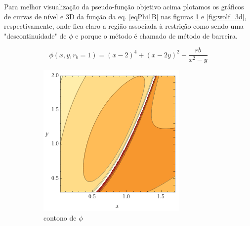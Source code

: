 \documentclass[10pt, a4paper]{article}
\begin{document}
\newpage
Para melhor visualiza\c c\~ao da pseudo-fun\c c\~ao objetivo acima plotamos os gr\'aficos de curvas de n\'ivel e 3D da fun\c c\~ao da eq. \ref{eqPhi1B} nas figuras \ref{fig:wolf_contour} e \ref{fig:wolf_3d}, respectivamente, onde fica claro a regi\~ao associada \`a restri\c c\~ao como sendo uma "descontinuidade" de $\phi$ e porque o m\'etodo \'e chamado de m\'etodo de barreira.

\begin{equation} \label{eqPhi1B}
      \phi (x,y, r_b=1) = (x-2)^4 + (x-2y)^2 - \frac{rb}{x^2-y}
\end{equation}

\begin{figure}[H]
      \centering
      \begin{subfigure}{0.35\textwidth}
            \includegraphics[width=\textwidth]{wolf_contour.PNG}
            \caption{contono de $\phi$}
            \label{fig:wolf_contour}
      \end{subfigure}
      \begin{subfigure}{0.45\textwidth}
            \centering

\end{subfigure}
\end{figure}
\end{document}
